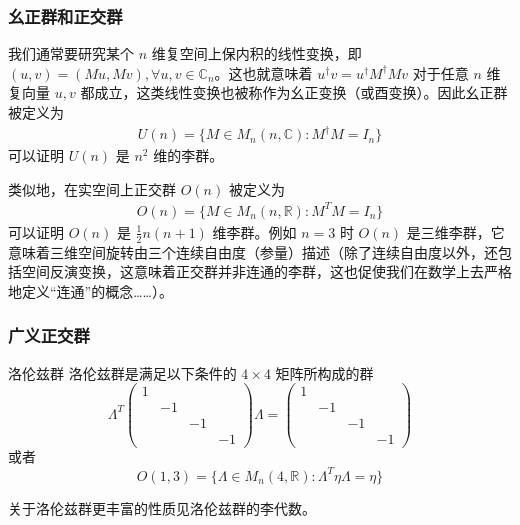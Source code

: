 \subsubsection{幺正群和正交群}
我们通常要研究某个 $n$ 维复空间上保内积的线性变换，即 $(u,v)=(Mu,Mv),\forall u,v\in \mathbb{C}_n$。这也就意味着 $u^\dagger v=u^\dagger M^\dagger M v$ 对于任意 $n$ 维复向量 $u,v$ 都成立，这类线性变换也被称作为幺正变换（或酉变换）。因此幺正群被定义为
\begin{equation}
\begin{aligned}
U(n)=\{ M\in M_n(n,\mathbb C): M^\dagger M=I_n \}
\end{aligned}
\end{equation}
可以证明 $U(n)$ 是 $n^2$ 维的李群。

类似地，在实空间上正交群 $O(n)$ 被定义为 
\begin{equation}
\begin{aligned}
O(n)=\{ M\in M_n(n,\mathbb R): M^T M=I_n \}
\end{aligned}
\end{equation}
可以证明 $O(n)$ 是 $\frac{1}{2}n(n+1)$ 维李群。例如 $n=3$ 时 $O(n)$ 是三维李群，它意味着三维空间旋转由三个连续自由度（参量）描述（除了连续自由度以外，还包括空间反演变换，这意味着正交群并非连通的李群，这也促使我们在数学上去严格地定义“连通”的概念……）。
\subsubsection{广义正交群}
\begin{definition}{洛伦兹群}
洛伦兹群是满足以下条件的 $4\times 4$ 矩阵所构成的群
\begin{equation}
\Lambda^T \begin{pmatrix}
1&&&\\
&-1&&\\
&&-1&\\
&&&-1
\end{pmatrix}\Lambda =\begin{pmatrix}
1&&&\\
&-1&&\\
&&-1&\\
&&&-1
\end{pmatrix}
\end{equation}
或者
\begin{equation}
O(1,3)=\{\Lambda\in M_n(4,\mathbb R):\Lambda^T\eta\Lambda=\eta\}
\end{equation}

\end{definition}
关于洛伦兹群更丰富的性质见洛伦兹群的李代数。

